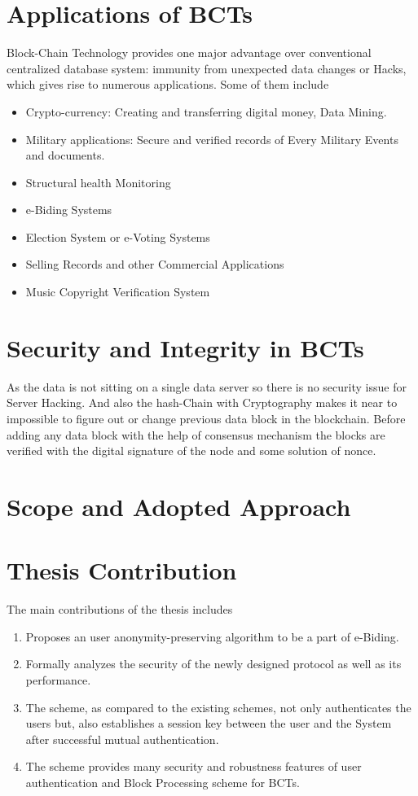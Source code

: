 \documentclass[a4paper,12pt]{report}
\begin{document}
\section{Applications of BCTs}
Block-Chain Technology provides one major advantage over conventional centralized database system: immunity from unexpected data changes or Hacks, which gives rise to numerous applications. Some of them include

\begin{itemize}
\item Crypto-currency: Creating and transferring digital money, Data Mining.
\item Military applications: Secure and verified records of Every Military Events and documents.
\item Structural health Monitoring
\item e-Biding Systems
\item Election System or e-Voting Systems
\item Selling Records and other Commercial Applications
\item Music Copyright Verification System
\end{itemize}

\section{Security and Integrity in BCTs}
As the data is not sitting on a single data server so there is no security issue for Server Hacking. And also the hash-Chain with Cryptography makes it near to impossible to figure out or change previous data block in the blockchain. Before adding any data block with the help of consensus mechanism the blocks are verified with the digital signature of the node and some solution of nonce.

\section{Scope and Adopted Approach}


\section{Thesis Contribution}
The main contributions of the thesis includes
\begin{enumerate}
\item Proposes an user anonymity-preserving algorithm to be a part of e-Biding.
\item Formally analyzes the security of the newly designed protocol as well as its performance.
\item The scheme, as compared to the existing schemes, not only authenticates the users but, also establishes a session key between the user and the System after successful mutual authentication.
\item The scheme provides many security and robustness features of user authentication and Block Processing scheme for BCTs.
\end{enumerate}
\end{document}
